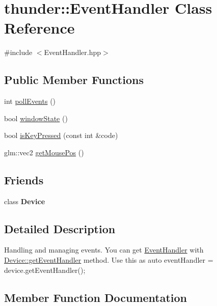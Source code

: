 \hypertarget{classthunder_1_1_event_handler}{}\section{thunder\+:\+:Event\+Handler Class Reference}
\label{classthunder_1_1_event_handler}


{\ttfamily \#include $<$Event\+Handler.\+hpp$>$}

\subsection*{Public Member Functions}
\begin{DoxyCompactItemize}
\item 
int \mbox{\hyperlink{classthunder_1_1_event_handler_a5eecf4f8169fadcdff0c378b45a492cf}{poll\+Events}} ()
\item 
bool \mbox{\hyperlink{classthunder_1_1_event_handler_a1740cedd7f75823bb0382d726adb397f}{window\+State}} ()
\item 
bool \mbox{\hyperlink{classthunder_1_1_event_handler_ac13e94d30a9a40d7a8169d86403694df}{is\+Key\+Pressed}} (const int \&code)
\item 
glm\+::vec2 \mbox{\hyperlink{classthunder_1_1_event_handler_a5134c61fe5b12ae754d6a89351dbbb06}{get\+Mouse\+Pos}} ()
\end{DoxyCompactItemize}
\subsection*{Friends}
\begin{DoxyCompactItemize}
\item 
\mbox{\label{classthunder_1_1_event_handler_a520fa05e0bf58785da428f7a0241eee2}} 
class {\bfseries Device}
\end{DoxyCompactItemize}


\subsection{Detailed Description}
Handling and managing events. You can get \mbox{\hyperlink{classthunder_1_1_event_handler}{Event\+Handler}} with \mbox{\hyperlink{classthunder_1_1_device_a6f27c1621c83c334d00cc9b04f5d2d5d}{Device\+::get\+Event\+Handler}} method. Use this as {\ttfamily auto event\+Handler = device.\+get\+Event\+Handler();} 

\subsection{Member Function Documentation}
\mbox{\label{classthunder_1_1_event_handler_a5134c61fe5b12ae754d6a89351dbbb06}} 
